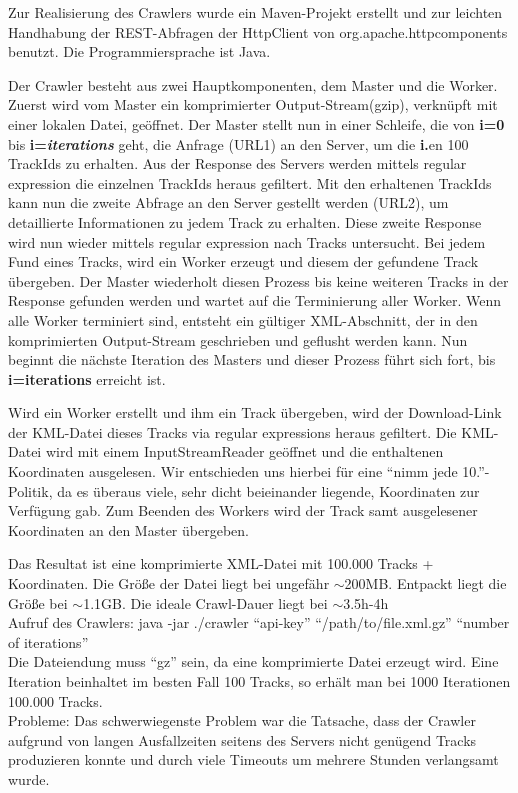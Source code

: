 Zur Realisierung des Crawlers wurde ein Maven-Projekt erstellt und zur leichten Handhabung
der REST-Abfragen der HttpClient von org.apache.httpcomponents benutzt. Die Programmiersprache ist Java.

Der Crawler besteht aus zwei Hauptkomponenten, dem Master und die Worker.
Zuerst wird vom Master ein komprimierter Output-Stream(gzip), verknüpft mit einer lokalen Datei, geöffnet.
Der Master stellt nun in einer Schleife, die von \textbf{i=0} bis \textbf{i=\textit{iterations}} geht,
die Anfrage (URL1) an den Server, um die \textbf{i.}en 100 TrackIds zu erhalten. Aus der Response des
Servers werden mittels regular expression die einzelnen TrackIds heraus gefiltert. Mit den erhaltenen
TrackIds kann nun die zweite Abfrage an den Server gestellt werden (URL2), um detaillierte Informationen
zu jedem Track zu erhalten. Diese zweite Response wird nun wieder mittels regular expression 
nach Tracks untersucht. Bei jedem Fund eines Tracks, wird ein Worker erzeugt und 
diesem der gefundene Track übergeben.
Der Master wiederholt diesen Prozess bis keine weiteren Tracks in der Response gefunden werden und
wartet auf die Terminierung aller Worker. Wenn alle Worker terminiert sind, entsteht ein 
gültiger XML-Abschnitt, der in den komprimierten Output-Stream geschrieben und geflusht werden kann.
Nun beginnt die nächste Iteration des Masters und dieser Prozess führt sich fort, bis 
\textbf{i=iterations} erreicht ist.

Wird ein Worker erstellt und ihm ein Track übergeben, wird der Download-Link der KML-Datei dieses Tracks
via regular expressions heraus gefiltert. Die KML-Datei wird mit einem InputStreamReader geöffnet und
die enthaltenen Koordinaten ausgelesen. Wir entschieden uns hierbei für eine "`nimm jede 10."'-Politik,
da es überaus viele, sehr dicht beieinander liegende, Koordinaten zur Verfügung gab.
Zum Beenden des Workers wird der Track samt ausgelesener Koordinaten an den Master übergeben.

Das Resultat ist eine komprimierte XML-Datei mit 100.000 Tracks + Koordinaten. Die Größe der Datei
liegt bei ungefähr $\sim$200MB. Entpackt liegt die Größe bei $\sim$1.1GB.
Die ideale Crawl-Dauer liegt bei $\sim$3.5h-4h\\

Aufruf des Crawlers: java -jar ./crawler "`api-key"' "`/path/to/file.xml.gz"' "`number of iterations"'\\
Die Dateiendung muss "`gz"' sein, da eine komprimierte Datei erzeugt wird. Eine Iteration beinhaltet 
im besten Fall 100 Tracks, so erhält man bei 1000 Iterationen 100.000 Tracks.\\

Probleme: Das schwerwiegenste Problem war die Tatsache, dass der Crawler aufgrund von langen Ausfallzeiten
seitens des Servers nicht genügend Tracks produzieren konnte und durch viele Timeouts um mehrere Stunden
verlangsamt wurde.

